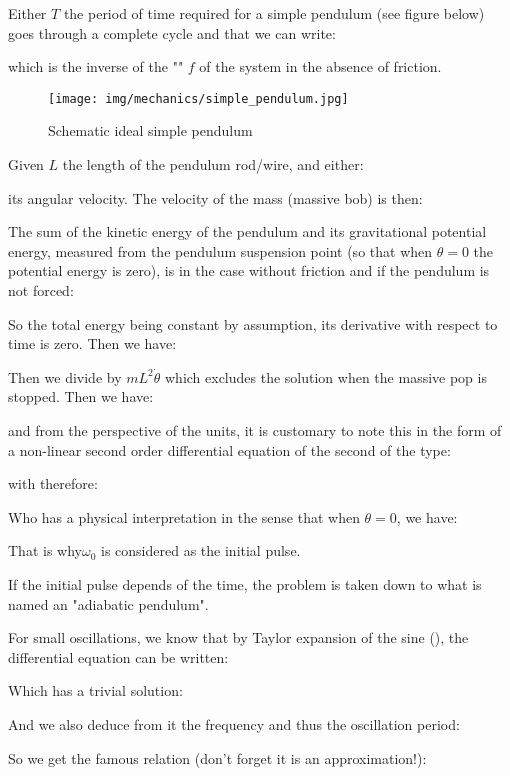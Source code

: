 	Either $T$ the period of time required for a simple pendulum (see figure below) goes through a complete cycle and that we can write:
	
	which is the inverse of the "" $f$ of the system in the absence of friction.
	\begin{figure}[H]
		\centering
		\texttt{[image: img/mechanics/simple\_pendulum.jpg]}
		\caption{Schematic ideal simple pendulum}
	\end{figure}
	Given $L$ the length of the pendulum rod/wire, and either:
	
	its angular velocity. The velocity of the mass (massive bob) is then:
	
	The sum of the kinetic energy of the pendulum and its gravitational potential energy, measured from the pendulum suspension point (so that when $\theta=0$ the potential energy is zero), is in the case without friction and if the pendulum is not forced:
	
	So the total energy being constant by assumption, its derivative with respect to time is zero. Then we have:
	
	Then we divide by $mL^2\dot{\theta}$ which excludes the solution when the massive pop is stopped. Then we have:
	
	and from the perspective of the units, it is customary to note this in the form of a non-linear second order differential equation of the second of the type:
	
	with therefore:
	
	Who has a physical interpretation in the sense that when $\theta=0$, we have:
	
	That is why$\omega_0$ is considered as the initial pulse.
	
	\begin{tcolorbox}[title=Remark,colframe=black,arc=10pt]
	If the initial pulse depends of the time, the problem is taken down to what is named an "adiabatic pendulum".
	\end{tcolorbox}
	For small oscillations, we know that by Taylor expansion of the sine (), the differential equation can be written:
	 
	Which has a trivial solution:
	
	And we also deduce from it the frequency and thus the oscillation period:
	
	So we get the famous relation (don't forget it is an approximation!):
	
